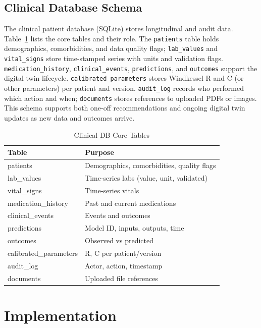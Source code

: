 \documentclass[conference]{IEEEtran}
\begin{document}
\subsection{Clinical Database Schema}
The clinical patient database (SQLite) stores longitudinal and audit data. Table~\ref{tab:schema} lists the core tables and their role. The \texttt{patients} table holds demographics, comorbidities, and data quality flags; \texttt{lab\_values} and \texttt{vital\_signs} store time-stamped series with units and validation flags. \texttt{medication\_history}, \texttt{clinical\_events}, \texttt{predictions}, and \texttt{outcomes} support the digital twin lifecycle. \texttt{calibrated\_parameters} stores Windkessel R and C (or other parameters) per patient and version. \texttt{audit\_log} records who performed which action and when; \texttt{documents} stores references to uploaded PDFs or images. This schema supports both one-off recommendations and ongoing digital twin updates as new data and outcomes arrive.

\begin{table}[t]
\caption{Clinical DB Core Tables}
\label{tab:schema}
\centering
\footnotesize
\begin{tabular}{@{}p{}p{}@{}}
\toprule
\textbf{Table} & \textbf{Purpose} \\
\midrule
patients & Demographics, comorbidities, quality flags \\
lab\_values & Time-series labs (value, unit, validated) \\
vital\_signs & Time-series vitals \\
medication\_history & Past and current medications \\
clinical\_events & Events and outcomes \\
predictions & Model ID, inputs, outputs, time \\
outcomes & Observed vs predicted \\
calibrated\_parameters & R, C per patient/version \\
audit\_log & Actor, action, timestamp \\
documents & Uploaded file references \\
\bottomrule
\end{tabular}
\end{table}

\section{Implementation}
\end{document}
